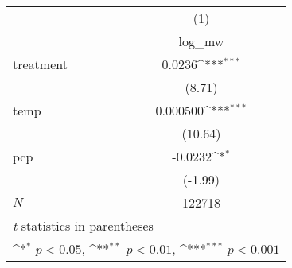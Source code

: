 {
\def\sym#1{\ifmmode^{#1}\else\(^{#1}\)\fi}
\begin{tabular}{l*{1}{c}}
\hline\hline
            &\multicolumn{1}{c}{(1)}\\
            &\multicolumn{1}{c}{log\_mw}\\
\hline
treatment   &      0.0236\sym{***}\\
            &      (8.71)         \\
[1em]
temp        &    0.000500\sym{***}\\
            &     (10.64)         \\
[1em]
pcp         &     -0.0232\sym{*}  \\
            &     (-1.99)         \\
\hline
\(N\)       &      122718         \\
\hline\hline
\multicolumn{2}{l}{\footnotesize \textit{t} statistics in parentheses}\\
\multicolumn{2}{l}{\footnotesize \sym{*} \(p<0.05\), \sym{**} \(p<0.01\), \sym{***} \(p<0.001\)}\\
\end{tabular}
}
